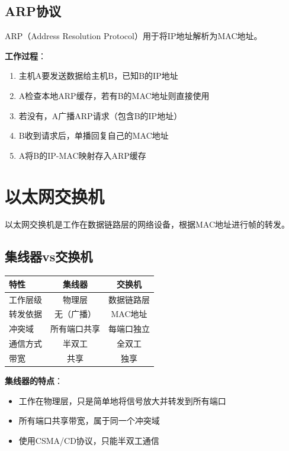 \documentclass[12pt,a4paper,openany]{ctexbook}
\begin{document}
\subsection{ARP协议}
ARP（Address Resolution Protocol）用于将IP地址解析为MAC地址。

\textbf{工作过程}：
\begin{enumerate}[leftmargin=2em,itemsep=0pt]
    \item 主机A要发送数据给主机B，已知B的IP地址
    \item A检查本地ARP缓存，若有B的MAC地址则直接使用
    \item 若没有，A广播ARP请求（包含B的IP地址）
    \item B收到请求后，单播回复自己的MAC地址
    \item A将B的IP-MAC映射存入ARP缓存
\end{enumerate}

\section{以太网交换机}
以太网交换机是工作在数据链路层的网络设备，根据MAC地址进行帧的转发。

\subsection{集线器vs交换机}
\begin{table}[htbp]
\centering\small
\begin{tabular}{lcc}
\toprule
\textbf{特性} & \textbf{集线器} & \textbf{交换机} \\
\midrule
工作层级 & 物理层 & 数据链路层 \\
转发依据 & 无（广播） & MAC地址 \\
冲突域 & 所有端口共享 & 每端口独立 \\
通信方式 & 半双工 & 全双工 \\
带宽 & 共享 & 独享 \\
\bottomrule
\end{tabular}
\end{table}

\textbf{集线器的特点}：
\begin{itemize}[leftmargin=2em,itemsep=0pt]
    \item 工作在物理层，只是简单地将信号放大并转发到所有端口
    \item 所有端口共享带宽，属于同一个冲突域
    \item 使用CSMA/CD协议，只能半双工通信
\end{itemize}
\end{document}

